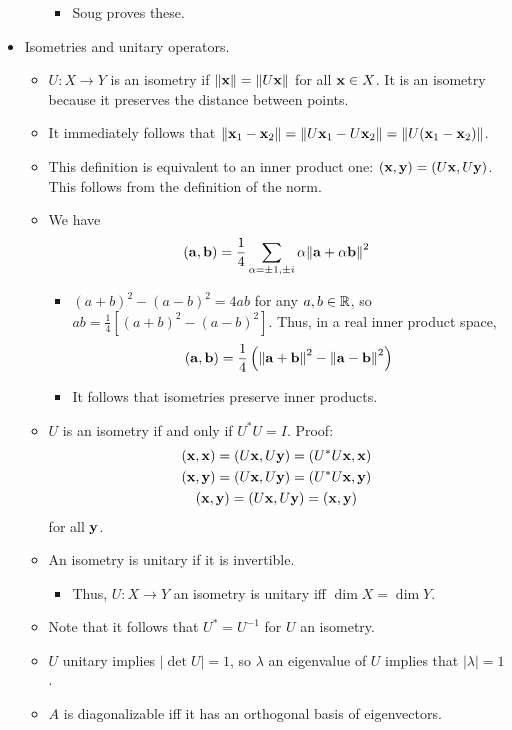 \documentclass[../../notes.tex]{subfiles}
\begin{document}
\begin{itemize}
\begin{itemize}
\begin{itemize}
            \item Soug proves these.
        \end{itemize}
    \end{itemize}
    \item Isometries and unitary operators.
    \begin{itemize}
        \item $U:X\to Y$ is an isometry if $\norm{\mathbf{x}}=\norm{U\mathbf{x}}$ for all $\mathbf{x}\in X$. It is an isometry because it preserves the distance between points.
        \item It immediately follows that $\norm{\mathbf{x}_1-\mathbf{x}_2}=\norm{U\mathbf{x}_1-U\mathbf{x}_2}=\norm{U(\mathbf{x}_1-\mathbf{x}_2)}$.
        \item This definition is equivalent to an inner product one: $(\mathbf{x},\mathbf{y})=(U\mathbf{x},U\mathbf{y})$. This follows from the definition of the norm.
        \item We have
        \begin{equation*}
            (\mathbf{a},\mathbf{b}) = \frac{1}{4}\sum_{\alpha=\pm 1,\pm i}\alpha\norm{\mathbf{a}+\alpha\mathbf{b}}^2
        \end{equation*}
        \begin{itemize}
            \item $(a+b)^2-(a-b)^2=4ab$ for any $a,b\in\mathbb{R}$, so $ab=\frac{1}{4}[(a+b)^2-(a-b)^2]$. Thus, in a real inner product space,
            \begin{equation*}
                (\mathbf{a},\mathbf{b}) = \frac{1}{4}\left( \norm{\mathbf{a}+\mathbf{b}}^2-\norm{\mathbf{a}-\mathbf{b}}^2 \right)
            \end{equation*}
            \item It follows that isometries preserve inner products.
        \end{itemize}
        \item $U$ is an isometry if and only if $U^*U=I$. Proof:
        \begin{gather*}
            (\mathbf{x},\mathbf{x}) = (U\mathbf{x},U\mathbf{y}) = (U^*U\mathbf{x},\mathbf{x})\\
            (\mathbf{x},\mathbf{y}) = (U\mathbf{x},U\mathbf{y}) = (U^*U\mathbf{x},\mathbf{y})\\
            (\mathbf{x},\mathbf{y}) = (U\mathbf{x},U\mathbf{y}) = (\mathbf{x},\mathbf{y})
        \end{gather*}
        for all $\mathbf{y}$.
        \item An isometry is unitary if it is invertible.
        \begin{itemize}
            \item Thus, $U:X\to Y$ an isometry is unitary iff $\dim X=\dim Y$.
        \end{itemize}
        \item Note that it follows that $U^*=U^{-1}$ for $U$ an isometry.
        \item $U$ unitary implies $|\det U|=1$, so $\lambda$ an eigenvalue of $U$ implies that $|\lambda|=1$.
        \item $A$ is diagonalizable iff it has an orthogonal basis of eigenvectors.
    \end{itemize}
\end{itemize}
\end{document}
